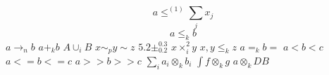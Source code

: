 \documentclass{article}
\begin{document}
\[ a\leq^{(1)}\sum_j x_j \]
\[ a\leq_k b \]
$a\to_n b$ $a+_k b$ $A\cup_i B$ $x\sim_p y\sim z$ $5.2\pm^{0.3}_{0.2}$ $x\times_i^2 y$
$x,y\le_{k} z$ $a=_{k}b=$ $a<b<c$ $a<=b<=c$ $a>>b>>c$
$\sum_i a_i\otimes_k b_i$ $\int f\otimes_{k}g$ $a\otimes_{k}DB$
\end{document}
